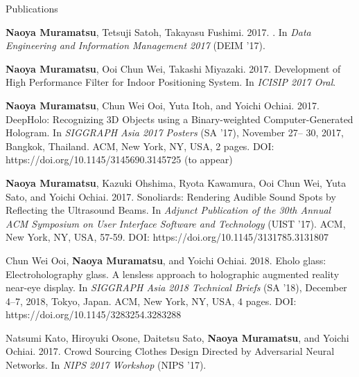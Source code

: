 \documentclass{resume} %
\begin{document}
\begin{rSection}{Publications} \itemsep 4pt

\item \textbf{Naoya Muramatsu}, Tetsuji Satoh, Takayasu Fushimi. 2017. . In \textit{Data Engineering and Information Management 2017} (DEIM '17). %
\item \textbf{Naoya Muramatsu}, Ooi Chun Wei, Takashi Miyazaki. 2017. Development of High Performance Filter for Indoor Positioning System. In \textit{ICISIP 2017 Oral}.
\item \textbf{Naoya Muramatsu}, Chun Wei Ooi, Yuta Itoh, and Yoichi Ochiai. 2017. DeepHolo: Recognizing 3D Objects using a Binary-weighted Computer-Generated Hologram. In \textit{SIGGRAPH Asia 2017 Posters} (SA '17), November 27– 30, 2017, Bangkok, Thailand. ACM, New York, NY, USA, 2 pages. DOI: https://doi.org/10.1145/3145690.3145725 (to appear)
\item \textbf{Naoya Muramatsu}, Kazuki Ohshima, Ryota Kawamura, Ooi Chun Wei, Yuta Sato, and Yoichi Ochiai. 2017. Sonoliards: Rendering Audible Sound Spots by Reflecting the Ultrasound Beams. In \textit{Adjunct Publication of the 30th Annual ACM Symposium on User Interface Software and Technology} (UIST ’17). ACM, New York, NY, USA, 57-59. DOI: https://doi.org/10.1145/3131785.3131807
\item Chun Wei Ooi, \textbf{Naoya Muramatsu}, and Yoichi Ochiai. 2018. Eholo glass: Electroholography glass. A lensless approach to holographic augmented reality near-eye display. In \textit{SIGGRAPH Asia 2018 Technical Briefs} (SA ’18), December 4–7, 2018, Tokyo, Japan. ACM, New York, NY, USA, 4 pages. DOI: https://doi.org/10.1145/3283254.3283288
\item Natsumi Kato, Hiroyuki Osone, Daitetsu Sato, \textbf{Naoya Muramatsu}, and Yoichi Ochiai. 2017. Crowd Sourcing Clothes Design Directed by Adversarial Neural Networks. In \textit{NIPS 2017 Workshop} (NIPS ’17).

\end{rSection}
\end{document}
